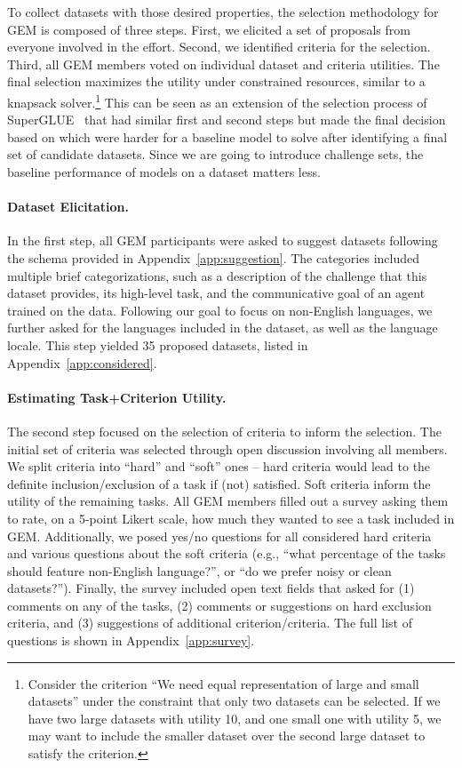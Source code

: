 \documentclass[11pt,a4paper]{article}
\newcommand{\GEM}{\textsc{GEM}}
\begin{document}
To collect datasets with those desired properties, the selection methodology for \GEM{} is composed of three steps. First, we elicited a set of proposals from everyone involved in the effort. Second, we identified criteria for the selection. Third, all \GEM{} members voted on individual dataset and criteria utilities. The final selection maximizes the utility under constrained resources, similar to a knapsack solver.\footnote{Consider the criterion ``We need equal representation of large and small datasets'' under the constraint that only two datasets can be selected. If we have two large datasets with utility 10, and one small one with utility 5, we may want to include the smaller dataset over the second large dataset to satisfy the criterion.}
This can be seen as an extension of the selection process of SuperGLUE~\citep{wang2019superglue} that had similar first and second steps but made the final decision based on which were harder for a baseline model to solve after identifying a final set of candidate datasets. Since we are going to introduce challenge sets, the baseline performance of models on a dataset matters less.

\paragraph{Dataset Elicitation.} In the first step, all \GEM{} participants were asked to suggest datasets following the schema provided in Appendix~\ref{app:suggestion}. The categories included multiple brief categorizations, such as a description of the challenge that this dataset provides, its high-level task, and the communicative goal of an agent trained on the data. Following our goal to focus on non-English languages, we further asked for the languages included in the dataset, as well as the language locale. This step yielded 35 proposed datasets, listed in Appendix~\ref{app:considered}.

\paragraph{Estimating Task+Criterion Utility.} The second step focused on the selection of criteria to inform the selection. The initial set of criteria was selected through open discussion involving all members.
We split criteria into ``hard'' and ``soft'' ones -- hard criteria would lead to the definite inclusion/exclusion of a task if (not) satisfied. Soft criteria inform the utility of the remaining tasks. All \GEM{} members filled out a survey asking them to rate, on a 5-point Likert scale, how much they wanted to see a task included in \GEM. Additionally, we posed yes/no questions for all considered hard criteria and various questions about the soft criteria (e.g., ``what percentage of the tasks should feature non-English language?'', or ``do we prefer noisy or clean datasets?''). 
Finally, the survey included open text fields that asked for (1) comments on any of the tasks, (2) comments or suggestions on hard exclusion criteria, and (3) suggestions of additional criterion/criteria. The full list of questions is shown in Appendix~\ref{app:survey}.
\end{document}
